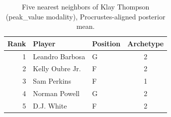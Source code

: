 \begin{table}[htbp]
  \centering\small
  \begin{tabular}{rllc}
    \toprule
    Rank & Player & Position & Archetype \\
    \midrule
    1 & Leandro Barbosa & G & 2 \\
    2 & Kelly Oubre Jr. & F & 2 \\
    3 & Sam Perkins & F & 1 \\
    4 & Norman Powell & G & 2 \\
    5 & D.J. White & F & 2 \\
    \bottomrule
  \end{tabular}
  \caption{Five nearest neighbors of Klay Thompson (peak_value modality), Procrustes-aligned posterior mean.}
  \label{tab:Klay_Thompson_neighbors_peak_value}
\end{table}

